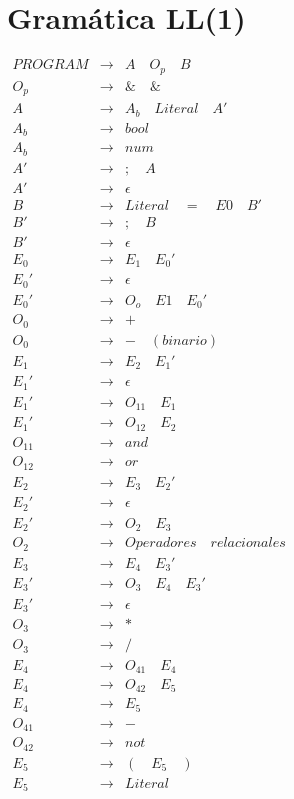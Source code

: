 \documentclass{article}
\begin{document}
\newpage

\section{Gramática LL(1)}

$
\begin{array}{lcl}
PROGRAM & \rightarrow & A\quad O_p\quad B \\
O_p & \rightarrow & \&\quad \& \\
A & \rightarrow & A_b\quad Literal\quad A' \\
A_b & \rightarrow & bool \\
A_b & \rightarrow & num \\
A' & \rightarrow & ;\quad  A\\
A' & \rightarrow & \epsilon\\
B & \rightarrow & Literal\quad =\quad E0\quad B' \\
B' & \rightarrow & ;\quad  B\\
B' & \rightarrow & \epsilon\\
E_0 & \rightarrow & E_1\quad E_0'  \\
E_0' & \rightarrow & \epsilon \\
E_0' & \rightarrow & O_o\quad E1\quad E_0' \\
O_0 & \rightarrow & + \\
O_0 & \rightarrow & -\quad (binario) \\
E_1 & \rightarrow & E_2\quad E_1' \\
E_1' & \rightarrow & \epsilon \\
E_1' & \rightarrow & O_{11}\quad E_{1}\\
E_1' & \rightarrow & O_{12}\quad E_{2}\\
O_{11} & \rightarrow & and \\
O_{12} & \rightarrow & or \\
E_2 & \rightarrow & E_3\quad E_2'\\
E_2' & \rightarrow & \epsilon \\
E_2' & \rightarrow & O_2\quad E_3 \\
O_2 & \rightarrow & Operadores\quad relacionales \\
E_3 & \rightarrow & E_4\quad E_3' \\
E_3' & \rightarrow & O_3\quad E_4\quad E_3'\\
E_3' & \rightarrow & \epsilon \\
O_3 & \rightarrow & * \\
O_3 & \rightarrow & / \\
E_4 & \rightarrow & O_{41}\quad E_4 \\
E_4 & \rightarrow & O_{42}\quad E_5 \\
E_4 & \rightarrow & E_5 \\
O_{41} & \rightarrow & - \\
O_{42} & \rightarrow & not \\
E_5 & \rightarrow & (\quad E_5 \quad) \\
E_5 & \rightarrow & Literal \\
\end{array}
$
\end{document}
